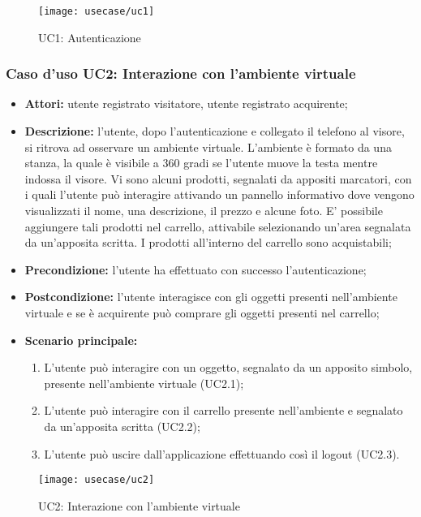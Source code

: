 \label{UC1}
\begin{figure}[ht]
	\begin{center}
		\texttt{[image: usecase/uc1]}
		\caption{UC1: Autenticazione}
	\end{center}
\end{figure}
\FloatBarrier

\subsubsection{Caso d'uso UC2: Interazione con l'ambiente virtuale}

\begin{itemize}
	\item \textbf{Attori:} utente registrato visitatore, utente registrato acquirente;
	\item \textbf{Descrizione:} l'utente, dopo l'autenticazione e collegato il telefono al visore, si ritrova ad osservare un ambiente virtuale. L'ambiente è formato da una stanza, la quale è visibile a 360 gradi se l'utente muove la testa mentre indossa il visore. Vi sono alcuni prodotti, segnalati da appositi marcatori, con i quali l'utente può interagire attivando un pannello informativo dove vengono visualizzati il nome, una descrizione, il prezzo e alcune foto. E' possibile aggiungere tali prodotti nel carrello, attivabile selezionando un'area segnalata da un'apposita scritta. I prodotti all'interno del carrello sono acquistabili;
	\item \textbf{Precondizione:} l'utente ha effettuato con successo l'autenticazione;
	\item \textbf{Postcondizione:} l'utente interagisce con gli oggetti presenti nell'ambiente virtuale e se è acquirente può comprare gli oggetti presenti nel carrello;
	\item \textbf{Scenario principale:}
	\begin{enumerate}
		\item L'utente può interagire con un oggetto, segnalato da un apposito simbolo, presente nell'ambiente virtuale (UC2.1);
		\item L'utente può interagire con il carrello presente nell'ambiente e segnalato da un'apposita scritta (UC2.2);
		\item L'utente può uscire dall'applicazione effettuando così il logout (UC2.3).
	\end{enumerate}
\end{itemize}

\label{UC2}
\begin{figure}[ht]
	\begin{center}
		\texttt{[image: usecase/uc2]}
		\caption{UC2: Interazione con l'ambiente virtuale}
	\end{center}
\end{figure}
\FloatBarrier

